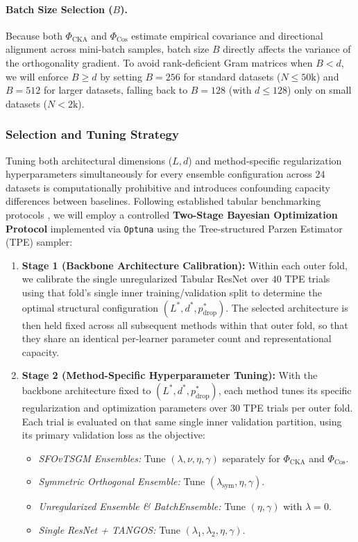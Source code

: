 \documentclass[11pt, a4paper]{article}
\begin{document}
\paragraph{Batch Size Selection ($B$).}
Because both $\Phi_{\text{CKA}}$ and $\Phi_{\text{Cos}}$ estimate empirical covariance and directional alignment across mini-batch samples, batch size $B$ directly affects the variance of the orthogonality gradient. To avoid rank-deficient Gram matrices when $B < d$, we will enforce $B \ge d$ by setting $B = 256$ for standard datasets ($N \le 50\text{k}$) and $B = 512$ for larger datasets, falling back to $B = 128$ (with $d \le 128$) only on small datasets ($N < 2\text{k}$).

\subsubsection{Selection and Tuning Strategy}
Tuning both architectural dimensions ($L, d$) and method-specific regularization hyperparameters simultaneously for every ensemble configuration across $24$ datasets is computationally prohibitive and introduces confounding capacity differences between baselines. Following established tabular benchmarking protocols \cite{kadra2021well, grinsztajn2022why}, we will employ a controlled \textbf{Two-Stage Bayesian Optimization Protocol} implemented via \texttt{Optuna} using the Tree-structured Parzen Estimator (TPE) sampler:

\begin{enumerate}
    \item \textbf{Stage 1 (Backbone Architecture Calibration):} Within each outer fold, we calibrate the single unregularized Tabular ResNet over $40$ TPE trials using that fold's single inner training/validation split to determine the optimal structural configuration $(L^*, d^*, p_{\text{drop}}^*)$. The selected architecture is then held fixed across all subsequent methods within that outer fold, so that they share an identical per-learner parameter count and representational capacity.
    \item \textbf{Stage 2 (Method-Specific Hyperparameter Tuning):} With the backbone architecture fixed to $(L^*, d^*, p_{\text{drop}}^*)$, each method tunes its specific regularization and optimization parameters over $30$ TPE trials per outer fold. Each trial is evaluated on that same single inner validation partition, using its primary validation loss as the objective:
    \begin{itemize}
        \item \textit{SFOvTSGM Ensembles:} Tune $(\lambda, \nu, \eta, \gamma)$ separately for $\Phi_{\text{CKA}}$ and $\Phi_{\text{Cos}}$.
        \item \textit{Symmetric Orthogonal Ensemble:} Tune $(\lambda_{\text{sym}}, \eta, \gamma)$.
        \item \textit{Unregularized Ensemble \& BatchEnsemble:} Tune $(\eta, \gamma)$ with $\lambda = 0$.
        \item \textit{Single ResNet + TANGOS:} Tune $(\lambda_1, \lambda_2, \eta, \gamma)$.
    \end{itemize}
\end{enumerate}
\end{document}
